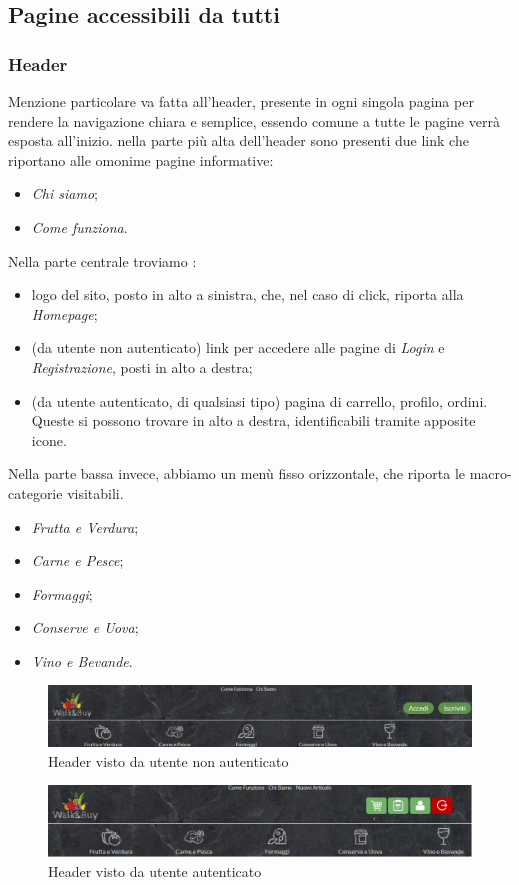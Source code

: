 \subsection{Pagine accessibili da tutti}
	\subsubsection{Header}
		Menzione particolare va fatta all'header, presente in ogni singola pagina per rendere la navigazione chiara e semplice, essendo comune a tutte le pagine verrà esposta all'inizio.
		nella parte più alta dell'header sono presenti due link che riportano alle omonime pagine informative:
		\begin{itemize}
			\item \textit{Chi siamo};
			\item \textit{Come funziona}.
		\end{itemize}
	
		Nella parte centrale troviamo :
		\begin{itemize}
			\item logo del sito, posto in alto a sinistra, che, nel caso di click, riporta alla \textit{Homepage};
			\item (da utente non autenticato) link per accedere alle pagine di \textit{Login} e \textit{Registrazione}, posti in alto a destra;
			\item (da utente autenticato, di qualsiasi tipo) pagina di carrello, profilo, ordini. Queste si possono trovare in alto a destra, identificabili tramite apposite icone.
		\end{itemize} 
		
		Nella parte bassa invece, abbiamo un menù fisso orizzontale, che riporta le macro-categorie visitabili.
		\begin{itemize}
			\item \textit{Frutta e Verdura};
			\item \textit{Carne e Pesce};
			\item \textit{Formaggi};
			\item \textit{Conserve e Uova};
			\item \textit{Vino e Bevande}.
		\end{itemize}
	\begin{figure}[H]
		\includegraphics[width=\linewidth]{res/img/HeaderNA}
		\caption{Header visto da utente non autenticato}
		\label{Header visto da utente non autenticato}
	\end{figure}
	\begin{figure}[H]
		\includegraphics[width=\linewidth]{res/img/HeaderAut}
		\caption{Header visto da utente autenticato}
		\label{Header visto da utente autenticato, azienda in questo caso}
	\end{figure}
